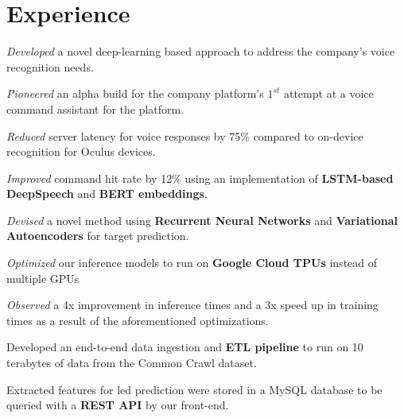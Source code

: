 \documentclass[]{deedy-resume-openfont}
\begin{document}
\begin{minipage}[t]{0.66\textwidth}


\section{Experience}
\vspace{\topsep} %
\begin{tightemize}
\item \emph{Developed} a novel deep-learning based approach to address the company's voice recognition needs.
\item \emph{Pioneered} an alpha build for the company platform's $1^{st}$ attempt at a voice command assistant for the platform.
\item \emph{Reduced} server latency for voice responses by 75\% compared to on-device recognition for Oculus devices.
\item \emph{Improved} command hit rate by 12\% using an implementation of \textbf{LSTM-based DeepSpeech} and \textbf{BERT embeddings}.
\end{tightemize}
\sectionsep

\begin{tightemize}
\item \emph{Devised} a novel method using \textbf{Recurrent Neural Networks} and \textbf{Variational Autoencoders} for target prediction.
\item \emph{Optimized} our inference models to run on \textbf{Google Cloud TPUs} instead of multiple GPUs
\item \emph{Observed} a 4x improvement in inference times and a 3x speed up in training times as a result of the aforementioned optimizations.
\item {Developed} an end-to-end data ingestion and \textbf{ETL pipeline} to run on 10 terabytes of data from the Common Crawl dataset.
\item Extracted features for led prediction were stored in a MySQL database to be queried with a \textbf{REST API} by our front-end.
\end{tightemize}
\sectionsep


\end{minipage}
\end{document}
